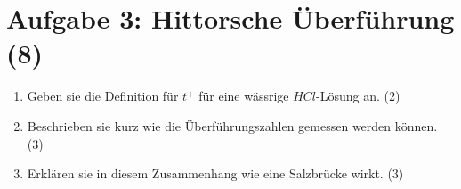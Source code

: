 \section*{Aufgabe 3: Hittorsche Überführung (8)}
\begin{enumerate}

\item Geben sie die Definition für \(t^{+}\) für eine wässrige \(HCl\)-Lösung an.
(2)

\item Beschrieben sie kurz wie die Überführungszahlen gemessen werden können. (3)

\item Erklären sie in diesem Zusammenhang wie eine Salzbrücke wirkt. (3) 
\end{enumerate}